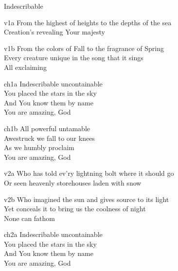 \begin{song}{Indescribable}

    \begin{songframe}{v1a}
        From the highest of heights to the depths of the sea \\
        Creation's revealing Your majesty \\
    \end{songframe}

    \begin{songframe}{v1b}
        From the colors of Fall to the fragrance of Spring \\
        Every creature unique in the song that it sings \\
        All exclaiming
    \end{songframe}


    \begin{songframe}{ch1a}
        Indescribable uncontainable \\
        You placed the stars in the sky \\
        And You know them by name \\
        You are amazing, God
    \end{songframe}

    \begin{songframe}{ch1b}
        All powerful untamable \\
        Awestruck we fall to our knees \\
        As we humbly proclaim \\
        You are amazing, God
    \end{songframe}


    \begin{songframe}{v2a}
        Who has told ev'ry lightning bolt where it should go \\
        Or seen heavenly storehouses laden with snow \\
    \end{songframe}

    \begin{songframe}{v2b}
        Who imagined the sun and gives source to its light \\
        Yet conceals it to bring us the coolness of night \\
        None can fathom
    \end{songframe}


    \begin{songframe}{ch2a}
        Indescribable uncontainable \\
        You placed the stars in the sky \\
        And You know them by name \\
        You are amazing, God
    \end{songframe}


\end{song}
